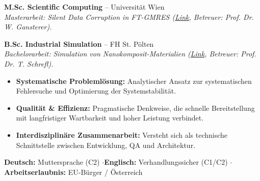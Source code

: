 \documentclass[10pt,a4paper]{article}
\begin{document}

\textbf{M.Sc. Scientific Computing} -- Universität Wien \\
\textit{Masterarbeit: Silent Data Corruption in FT-GMRES (\href{https://utheses.univie.ac.at/detail/40917/}{Link}, Betreuer: Prof. Dr. W. Gansterer).}

\vspace{0.1cm}
\textbf{B.Sc. Industrial Simulation} -- FH St. Pölten \\
\textit{Bachelorarbeit: Simulation von Nanokomposit-Materialien (\href{\meinGithub}{Link}, Betreuer: Prof. Dr. T. Schrefl).}


\begin{itemize}
    \item \textbf{Systematische Problemlösung:} Analytischer Ansatz zur systematischen Fehlersuche und Optimierung der Systemstabilität.
    \item \textbf{Qualität \& Effizienz:} Pragmatische Denkweise, die schnelle Bereitstellung mit langfristiger Wartbarkeit und hoher Leistung verbindet.
    \item \textbf{Interdisziplinäre Zusammenarbeit:} Versteht sich als technische Schnittstelle zwischen Entwicklung, QA und Architektur.
\end{itemize}


\textbf{Deutsch:} Muttersprache (C2) \quad$\cdot$\quad \textbf{Englisch:} Verhandlungssicher (C1/C2) \quad$\cdot$\quad \textbf{Arbeitserlaubnis:} EU-Bürger / Österreich
\end{document}
